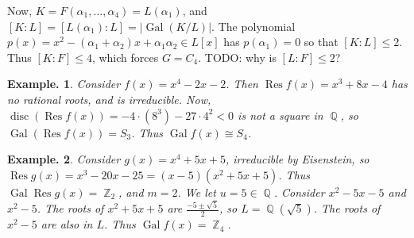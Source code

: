 \documentclass[11pt, a4paper]{memoir}
\DeclareMathOperator{\Q}{{\mathbb{Q}}}
\DeclareMathOperator{\Z}{{\mathbb{Z}}}
\theoremstyle{change}
\theoremstyle{plain}
\theoremstyle{nonumberplain}
\newtheorem{example}{Example.}
\DeclareMathOperator{\disc}{disc}
\DeclareMathOperator{\Gal}{Gal}
\DeclareMathOperator{\Res}{Res}
\numberwithin{equation}{section}
\begin{document}
Now, $K=F(\alpha_1,\ldots,\alpha_4)=L(\alpha_1)$, and $[K:L]=[L(\alpha_1):L]=|\Gal(K/L)|$.
The polynomial $p(x)=x^2-(\alpha_1+\alpha_2)x+\alpha_1\alpha_2\in L[x]$ has $p(\alpha_1)=0$ so that $[K:L]\leq 2$.
Thus $[K:F]\leq 4$, which forces $G=C_4$.
TODO: why is $[L:F]\leq 2$?
\begin{example}
    Consider $f(x)=x^4-2x-2$.
    Then $\Res f(x)=x^3+8x-4$ has no rational roots, and is irreducible.
    Now, $\disc(\Res f(x))=-4\cdot(8^3)-27\cdot 4^2<0$ is not a square in $\Q$, so $\Gal(\Res f(x))=S_3$.
    Thus $\Gal f(x)\cong S_4$.
\end{example}
\begin{example}
    Consider $g(x)=x^4+5x+5$, irreducible by Eisenstein, so $\Res g(x)=x^3-20x-25=(x-5)(x^2+5x+5)$.
    Thus $\Gal\Res g(x)=\Z_2$, and $m=2$.
    We let $u=5\in\Q$.
    Consider $x^2-5x-5$ and $x^2-5$.
    The roots of $x^2+5x+5$ are $\frac{-5\pm\sqrt{5}}{2}$, so $L=\Q(\sqrt{5})$.
    The roots of $x^2-5$ are also in $L$.
    Thus $\Gal f(x)=\Z_4$.
\end{example}
\end{document}
